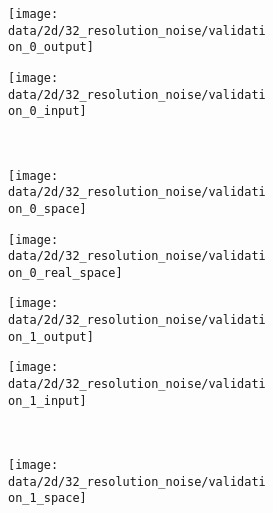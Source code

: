 \begin{figure}
  \begin{subfigure}[]{0.125\textwidth}
    \vfill
    \vfill
  \end{subfigure}
  \begin{subfigure}[t]{0.25\textwidth}
    \begin{subfigure}[t]{0.49\textwidth}
      \texttt{[image: data/2d/32\_resolution\_noise/validation\_0\_output]}
    \end{subfigure}\hfill
    \begin{subfigure}[t]{0.49\textwidth}
      \texttt{[image: data/2d/32\_resolution\_noise/validation\_0\_input]}
    \end{subfigure}\\[-2px]
    \begin{subfigure}[t]{0.49\textwidth}
      \texttt{[image: data/2d/32\_resolution\_noise/validation\_0\_space]}
    \end{subfigure}\hfill
    \begin{subfigure}[t]{0.49\textwidth}
      \texttt{[image: data/2d/32\_resolution\_noise/validation\_0\_real\_space]}
    \end{subfigure}
  \end{subfigure}
  \begin{subfigure}[t]{0.25\textwidth}
    \begin{subfigure}[t]{0.49\textwidth}
      \texttt{[image: data/2d/32\_resolution\_noise/validation\_1\_output]}
    \end{subfigure}\hfill
    \begin{subfigure}[t]{0.49\textwidth}
      \texttt{[image: data/2d/32\_resolution\_noise/validation\_1\_input]}
    \end{subfigure}\\[-2px]
    \begin{subfigure}[t]{0.49\textwidth}
      \texttt{[image: data/2d/32\_resolution\_noise/validation\_1\_space]}
    \end{subfigure}\hfill

\end{subfigure}
\end{figure}
